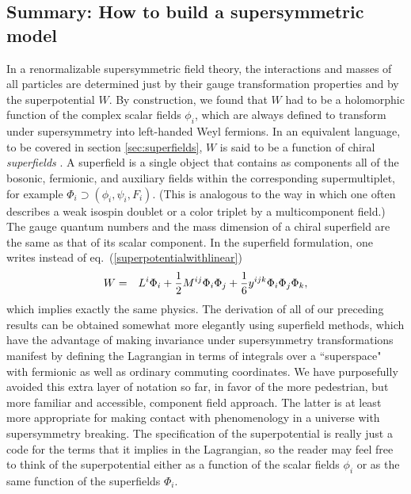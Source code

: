 \documentclass[11pt]{article}
\renewcommand{\theequation}{\arabic{section}.\arabic{equation}}
\def\beq{\begin{eqnarray}}
\def\eeq{\end{eqnarray}}
\begin{document}
\subsection{Summary: How to build a supersymmetric
model}\label{subsec:susylagr.summary}
\setcounter{footnote}{1}
\renewcommand{\theequation}{\arabic{section}.\arabic{subsection}.\arabic{equation}}
\setcounter{equation}{0}

In a renormalizable supersymmetric field theory, the interactions and
masses of all particles are determined just by their gauge transformation
properties and by the superpotential $W$. By construction, we found that
$W$ had to be a holomorphic function of the complex scalar fields $\phi_i$,
which are always defined to transform under supersymmetry into left-handed
Weyl fermions. In an equivalent language, to be covered 
in section \ref{sec:superfields}, $W$ is
said to be a function of chiral {\it superfields} \cite{superfields}. A
superfield is a single object that contains as components all of the
bosonic, fermionic, and auxiliary fields within the corresponding
supermultiplet, for example $\Phi_i \supset (\phi_i,\psi_i,F_i)$. (This is
analogous to the way in which one often describes a weak isospin doublet
or a color triplet by a multicomponent field.) The gauge quantum numbers and
the mass dimension of a chiral superfield are the same as that of its
scalar component. In the superfield formulation, one writes instead of
eq.~(\ref{superpotentialwithlinear})
\beq
W &=& 
L^i \Phi_i +
{1\over 2}M^{ij} \Phi_i\Phi_j +{1\over 6} y^{ijk} \Phi_i \Phi_j \Phi_k 
,
\label{superpot}
\eeq
which implies exactly the same physics. The derivation of all of our
preceding results can be obtained somewhat more elegantly using superfield
methods, which have the advantage of making invariance under supersymmetry
transformations manifest by defining the Lagrangian in terms of integrals
over a ``superspace" with fermionic as well as ordinary commuting
coordinates. We have purposefully avoided this extra layer of notation so far, in
favor of the more pedestrian, but more familiar and accessible, component
field approach. The latter is at least more appropriate for making contact
with phenomenology in a universe with supersymmetry breaking.  
The specification of the superpotential
is really just a code for the terms that it implies in the Lagrangian, so the
reader may feel free to think of the superpotential either as a function
of the scalar fields $\phi_i$ or as the same function of the superfields
$\Phi_i$. 
\end{document}
